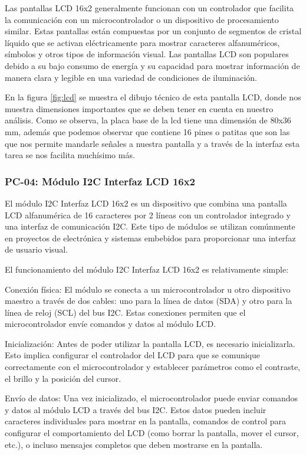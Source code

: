     Las pantallas LCD 16x2 generalmente funcionan con un controlador que facilita la comunicación con un microcontrolador o un dispositivo de procesamiento similar. Estas pantallas están compuestas por un conjunto de segmentos de cristal líquido que se activan eléctricamente para mostrar caracteres alfanuméricos, símbolos y otros tipos de información visual. Las pantallas LCD son populares debido a su bajo consumo de energía y su capacidad para mostrar información de manera clara y legible en una variedad de condiciones de iluminación.
    
    
    En la figura \ref{fig:lcd} se muestra el dibujo técnico de esta pantalla LCD, donde nos muestra dimensiones importantes que se deben tener en cuenta en nuestro análisis. Como se observa, la placa base de la lcd tiene una dimensión de 80x36 mm, además que podemos observar que contiene 16 pines o patitas que son las que nos permite mandarle señales a nuestra pantalla y a través de la interfaz esta tarea se nos facilita muchísimo más.
    
    
    
    \subsubsection{PC-04: Módulo I2C Interfaz LCD 16x2 }
    
    El módulo I2C Interfaz LCD 16x2 es un dispositivo que combina una pantalla LCD alfanumérica de 16 caracteres por 2 líneas con un controlador integrado y una interfaz de comunicación I2C. Este tipo de módulos se utilizan comúnmente en proyectos de electrónica y sistemas embebidos para proporcionar una interfaz de usuario visual.
    
    El funcionamiento del módulo I2C Interfaz LCD 16x2 es relativamente simple:
    
    Conexión física: El módulo se conecta a un microcontrolador u otro dispositivo maestro a través de dos cables: uno para la línea de datos (SDA) y otro para la línea de reloj (SCL) del bus I2C. Estas conexiones permiten que el microcontrolador envíe comandos y datos al módulo LCD.
    
    Inicialización: Antes de poder utilizar la pantalla LCD, es necesario inicializarla. Esto implica configurar el controlador del LCD para que se comunique correctamente con el microcontrolador y establecer parámetros como el contraste, el brillo y la posición del cursor.
    
    Envío de datos: Una vez inicializado, el microcontrolador puede enviar comandos y datos al módulo LCD a través del bus I2C. Estos datos pueden incluir caracteres individuales para mostrar en la pantalla, comandos de control para configurar el comportamiento del LCD (como borrar la pantalla, mover el cursor, etc.), o incluso mensajes completos que deben mostrarse en la pantalla.
    
